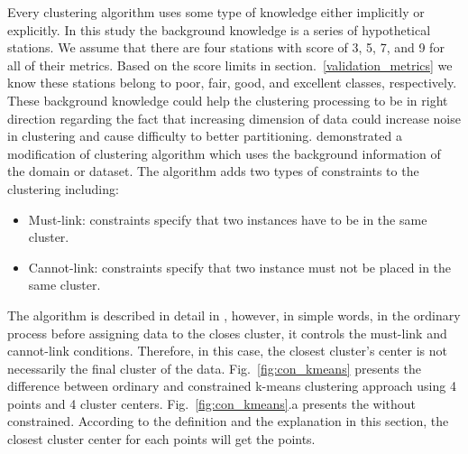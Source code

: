 {	Every clustering algorithm uses some type of knowledge either implicitly or explicitly. In this study the background knowledge is a series of hypothetical stations. We assume that there are four stations with score of 3, 5, 7, and 9 for all of their metrics. Based on the score limits in section.~\ref{validation_metrics} we know these stations belong to poor, fair, good, and excellent classes, respectively. These background knowledge could help the clustering processing to be in right direction regarding the fact that increasing dimension of data could increase noise in clustering and cause difficulty to better partitioning. \citet{Wagstaff_2001_Proc}  demonstrated a modification of \kmeans{} clustering algorithm which uses the background information of the domain or dataset. The algorithm adds two types of constraints to the clustering including:
	\begin{itemize}
	\item{Must-link: constraints specify that two instances have to be in the same cluster.}
	\item{Cannot-link: constraints specify that two instance must not be placed in the same cluster.}
	\end{itemize} 
	The algorithm is described in detail in \citet{Wagstaff_2001_Proc}, however, in simple words, in the ordinary \kmeans{} process before assigning data to the closes cluster, it controls the must-link and cannot-link conditions. Therefore, in this case, the closest cluster's center is not necessarily the final cluster of the data. Fig.~\ref{fig:con_kmeans} presents the difference between ordinary and constrained k-means clustering approach using 4 points and 4 cluster centers. Fig.~\ref{fig:con_kmeans}.a presents the \kmeans{} without constrained. According to the definition and the explanation in this section, the closest cluster center for each points will get the points.
	
}
